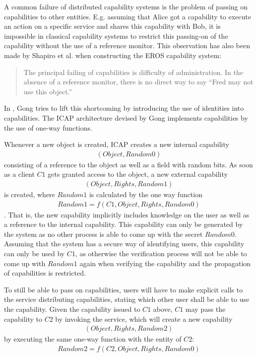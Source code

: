 A common failure of distributed capability systems is the problem of passing on capabilities to other entities.
E.g. assuming that Alice got a capability to execute an action on a specific service and shares this capability with Bob, it is impossible in classical capability systems to restrict this passing-on of the capability without the use of a reference monitor.
This observation has also been made by Shapiro et al. when constructing the EROS capability system:
\begin{quote}
    The principal failing of capabilities is difficulty of administration.
    In the absence of a reference monitor, there is no direct way to say ``Fred may not use this object.'' \cite{shapiro1999eros}
\end{quote}

In \cite{gong1989secure}, Gong tries to lift this shortcoming by introducing the use of identities into capabilities.
The ICAP architecture devised by Gong implements capabilities by the use of one-way functions.

Whenever a new object is created, ICAP creates a new internal capability
\begin{align*}
    (Object, Random0)
\end{align*}
consisting of a reference to the object as well as a field with random bits.
As soon as a client $C1$ gets granted access to the object, a new external capability
\begin{align*}
    (Object, Rights, Random1)
\end{align*}
is created, where $Random1$ is calculated by the one way function
\begin{align*}
    Random1 = f(C1, Object, Rights, Random0)
\end{align*}.
That is, the new capability implicitly includes knowledge on the user as well as a reference to the internal capability.
This capability can only be generated by the system as no other process is able to come up with the secret $Random0$.
Assuming that the system has a secure way of identifying users, this capability can only be used by $C1$, as otherwise the verification process will not be able to come up with $Random1$ again when verifying the capability and the propagation of capabilities is restricted.

To still be able to pass on capabilities, users will have to make explicit calls to the service distributing capabilities, stating which other user shall be able to use the capability.
Given the capability issued to $C1$ above, $C1$ may pass the capability to $C2$ by invoking the service, which will create a new capability 
\begin{align*}
    (Object, Rights, Random2)
\end{align*}
by executing the same one-way function with the entity of $C2$:
\begin{align*}
    Random2 = f(C2, Object, Rights, Random0)
\end{align*}

